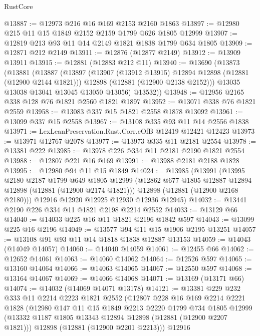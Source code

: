 \begin{lexlean}{RustCore}
\begin{coremodule}
@13887 := @12973 @216 @16 @169 @2153 @2160 @1863
@13897 := @12980 @215 @11 @15 @1849 @2152 @2159 @1799 @626 @1805 @12999
@13907 := @12819 @213 @93 @11 @14 @2149 @1821 @1838 @1799 @634 @1805
@13909 := @12871 @212 @2149
@13911 := @12876 (@12877 @2149)
@13912 := @13909 @13911
@13915 := @12881 (@12883 @212 @11)
@13940 := @13690
    (@13873
      (@13881
        (@13887
          (@13897
            (@13907 (@13912 @13915) @12894 @12898 (@12881 (@12900 @2144 @1821)))
            @12898
            (@12881 (@12900 @2138 @2152)))
          @13035
          @13038
          @13041
          @13045
          @13050
          @13056)
        @13532))
@13948 := @12956 @2165 @338 @128 @76 @1821 @2560 @1821 @1897
@13952 := @13071 @338 @76 @1821 @2559
@13958 := @13083 @337 @15 @1821 @2558 @1878 @13092
@13961 := @13099 @337 @15 @2558
@13967 := @13108 @335 @93 @11 @14 @2556 @1838
@13971 := LexLeanPreservation.Rust.Corr.eOfB @12419 @12421 @12423
@13973 := @13971 @12767 @2078
@13977 := @13973 @335 @11 @2181 @2554
@13978 := @13381 @222
@13985 := @13978 @226 @334 @11 @2181 @2190 @1821 @2554
@13988 := @12807 @221 @16 @169
@13991 := @13988 @2181 @2188 @1828
@13995 := @12980 @94 @11 @15 @1849
@14024 := @13985
    (@13991
      (@13995
        @2180
        @2187
        @1799
        @649
        @1805
        @12999
        (@12862 @677 @1805 @12887 @12894 @12898 (@12881 (@12900 @2174 @1821)))
        @12898
        (@12881 (@12900 @2168 @2180)))
      @12916
      @12920
      @12925
      @12930
      @12936
      @12945)
@14032 := @13441 @2190 @226 @334 @11 @1821 @2198 @2214 @2552
@14033 := @13129 @66
@14040 := @14033 @225 @16 @11 @1821 @2196 @1842 @597
@14043 := @13099 @225 @16 @2196
@14049 := @13577 @94 @11 @15 @1906 @2195 @13251
@14057 := @13108 @91 @93 @11 @14 @1818 @1838 @12887 @13153
@14059 := @14043 (@14049 @14057)
@14060 := @14040 @14059
@14061 := @12455 @66
@14062 := @12652 @14061
@14063 := @14060 @14062
@14064 := @12526 @597
@14065 := @13160 @14064
@14066 := @14063 @14065
@14067 := @12550 @597
@14068 := @13164 @14067
@14069 := @14066 @14068
@14071 := @13169 (@13171 @66)
@14074 := @14032 (@14069 @14071 @13178)
@14121 := @13381
    @229
    @232
    @333
    @11
    @2214
    @2223
    @1821
    @2552
    (@12807
      @228
      @16
      @169
      @2214
      @2221
      @1828
      (@12980
        @147
        @11
        @15
        @1849
        @2213
        @2220
        @1799
        @734
        @1805
        @12999
        (@13332 @1187 @1805 @13343 @12894 @12898 (@12881 (@12900 @2207 @1821)))
        @12898
        (@12881 (@12900 @2201 @2213)))
      @12916

\end{coremodule}
\end{lexlean}
